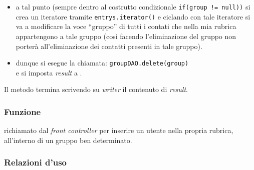 \begin{description}
\begin{itemize}
		\item a tal punto (sempre dentro al costrutto condizionale \texttt{if(group != null))} si crea un iteratore tramite \texttt{entrys.iterator()} e ciclando con tale iteratore si va a modificare la voce ``gruppo'' di tutti i contati che nella mia rubrica appartengono a tale gruppo (cosi facendo l'eliminazione del gruppo non porterà all'eliminazione dei contatti presenti in tale gruppo).
		\item dunque si esegue la chiamata:
		\verb|groupDAO.delete(group)|\\
		e si imposta \textit{result} a .
	\end{itemize}
	Il metodo termina scrivendo su \textit{writer} il contenuto di \textit{result}.
	
\end{description}



\subsubsection*{Funzione}
 richiamato dal \textit{front controller} per inserire un utente nella propria rubrica, all'interno di un gruppo ben determinato.

\subsubsection*{Relazioni d'uso}

